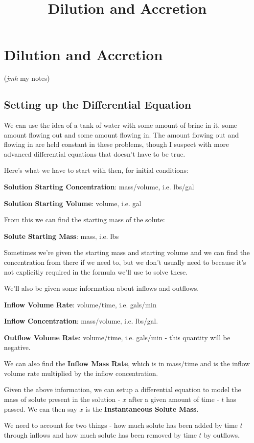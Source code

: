 \documentclass{article}
\title{Dilution and Accretion}
\begin{document}
\section{Dilution and Accretion}
(\emph{jmh} my notes)

\subsection{Setting up the Differential Equation}

We can use the idea of a tank of water with some amount of brine in it, some amount flowing out and some amount flowing in. The amount flowing out and flowing in are held constant in these problems, though I suspect with more advanced differential equations that doesn't have to be true.

Here's what we have to start with then, for initial conditions:

\textbf{Solution Starting Concentration}: mass/volume, i.e. lbs/gal

\textbf{Solution Starting Volume}: volume, i.e. gal

From this we can find the starting mass of the solute:

\textbf{Solute Starting Mass}: mass, i.e. lbs

Sometimes we're given the starting mass and starting volume and we can find the concentration from there if we need to, but we don't usually need to because it's not explicitly required in the formula we'll use to solve these.

We'll also be given some information about inflows and outflows.

\textbf{Inflow Volume Rate}: volume/time, i.e. gals/min

\textbf{Inflow Concentration}: mass/volume, i.e. lbs/gal.

\textbf{Outflow Volume Rate}: volume/time, i.e. gals/min - this quantity will be negative.

We can also find the \textbf{Inflow Mass Rate}, which is in mass/time and is the inflow volume rate multiplied by the inflow concentration.

Given the above information, we can setup a differential equation to model the mass of solute present in the solution - $x$ after a given amount of time - $t$ has passed. We can then say $x$ is the \textbf{Instantaneous Solute Mass}.

We need to account for two things - how much solute has been added by time $t$ through inflows and how much solute has been removed by time $t$ by outflows.
\end{document}
